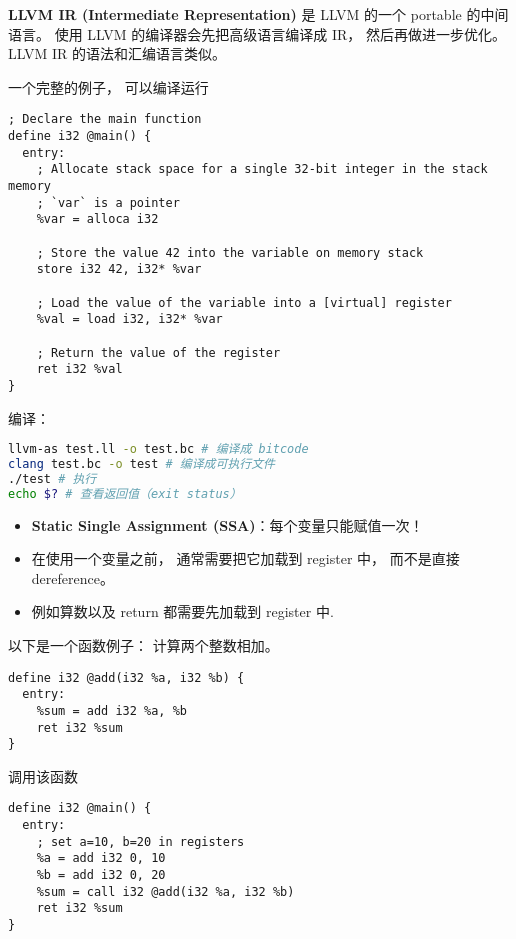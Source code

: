 
\begin{issues}
\issueDraft
\end{issues}


\textbf{LLVM IR (Intermediate Representation)} 是 LLVM 的一个 portable 的中间语言。 使用 LLVM 的编译器会先把高级语言编译成 IR， 然后再做进一步优化。 LLVM IR 的语法和汇编语言类似。

一个完整的例子， 可以编译运行
\begin{lstlisting}[language=none,caption=test.ll]
; Declare the main function
define i32 @main() {
  entry:
    ; Allocate stack space for a single 32-bit integer in the stack memory
    ; `var` is a pointer
    %var = alloca i32

    ; Store the value 42 into the variable on memory stack
    store i32 42, i32* %var

    ; Load the value of the variable into a [virtual] register
    %val = load i32, i32* %var

    ; Return the value of the register
    ret i32 %val
}
\end{lstlisting}

编译：
\begin{lstlisting}[language=bash]
llvm-as test.ll -o test.bc # 编译成 bitcode
clang test.bc -o test # 编译成可执行文件
./test # 执行
echo $? # 查看返回值（exit status）
\end{lstlisting}

\begin{itemize}
\item \textbf{Static Single Assignment (SSA)}：每个变量只能赋值一次！
\item  在使用一个变量之前， 通常需要把它加载到 register 中， 而不是直接 dereference。
\item 例如算数以及 return 都需要先加载到 register 中.
\end{itemize}

以下是一个函数例子： 计算两个整数相加。
\begin{lstlisting}[language=none]
define i32 @add(i32 %a, i32 %b) {
  entry:
    %sum = add i32 %a, %b
    ret i32 %sum
}
\end{lstlisting}

调用该函数
\begin{lstlisting}[language=none]
define i32 @main() {
  entry:
    ; set a=10, b=20 in registers
    %a = add i32 0, 10
    %b = add i32 0, 20
    %sum = call i32 @add(i32 %a, i32 %b)
    ret i32 %sum
}
\end{lstlisting}

